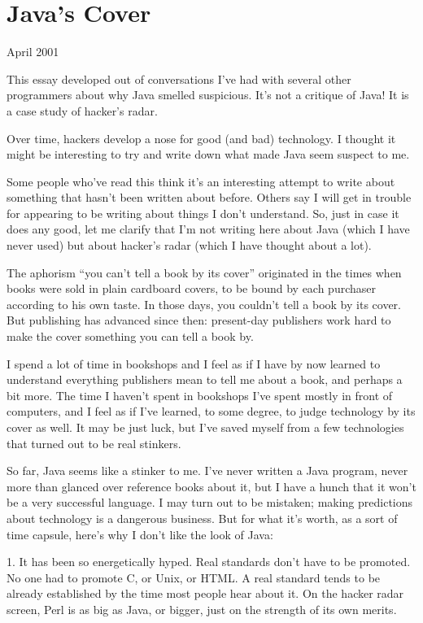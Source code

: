 \documentclass[12pt]{book}
\begin{document}
\chapter{Java's Cover}

April 2001

This essay developed out of conversations I've had with several other
programmers about why Java smelled suspicious. It's not a critique of
Java! It is a case study of hacker's radar.

Over time, hackers develop a nose for good (and bad) technology. I
thought it might be interesting to try and write down what made Java
seem suspect to me.

Some people who've read this think it's an interesting attempt to write
about something that hasn't been written about before. Others say I will
get in trouble for appearing to be writing about things I don't
understand. So, just in case it does any good, let me clarify that I'm
not writing here about Java (which I have never used) but about hacker's
radar (which I have thought about a lot).

The aphorism ``you can't tell a book by its cover'' originated in the
times when books were sold in plain cardboard covers, to be bound by
each purchaser according to his own taste. In those days, you couldn't
tell a book by its cover. But publishing has advanced since then:
present-day publishers work hard to make the cover something you can
tell a book by.

I spend a lot of time in bookshops and I feel as if I have by now
learned to understand everything publishers mean to tell me about a
book, and perhaps a bit more. The time I haven't spent in bookshops I've
spent mostly in front of computers, and I feel as if I've learned, to
some degree, to judge technology by its cover as well. It may be just
luck, but I've saved myself from a few technologies that turned out to
be real stinkers.

So far, Java seems like a stinker to me. I've never written a Java
program, never more than glanced over reference books about it, but I
have a hunch that it won't be a very successful language. I may turn out
to be mistaken; making predictions about technology is a dangerous
business. But for what it's worth, as a sort of time capsule, here's why
I don't like the look of Java:

1. It has been so energetically hyped. Real standards don't have to be
promoted. No one had to promote C, or Unix, or HTML. A real standard
tends to be already established by the time most people hear about it.
On the hacker radar screen, Perl is as big as Java, or bigger, just on
the strength of its own merits.
\end{document}

